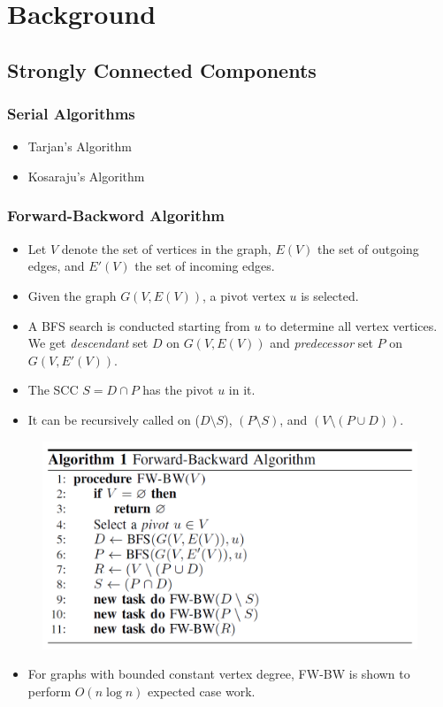 \section{Background}

\subsection{Strongly Connected Components}
\begin{frame}
	\frametitle{Serial Algorithms}
	\begin{itemize}
		\setlength\itemsep{1em}
		\item Tarjan's Algorithm
		\item Kosaraju's Algorithm
	\end{itemize}
\end{frame}

\begin{frame}
	\frametitle{Forward-Backword Algorithm}
	\begin{itemize}
		\setlength\itemsep{1em}
		\item Let $V$ denote the set of vertices in the graph,
			$E(V)$ the set of outgoing edges, and $E'(V)$ the set
			of incoming edges.
		\item Given the graph $G(V, E(V))$, a pivot vertex $u$ is selected.
		\item A BFS search is conducted starting from $u$ to determine all 
			vertex vertices. We get \textit{descendant} set $D$ on $G(V, E(V))$ 
			and \textit{predecessor} set $P$ on $G(V, E'(V))$.
		\item The SCC $S = D \cap P$ has the pivot $u$ in it.
		\item It can be recursively called on ($D \setminus S$), 
			$(P \setminus S)$, and $(V \setminus (P \cup D))$.
	\end{itemize}
\end{frame}

\begin{frame}
	\begin{figure}
		\includegraphics[scale=0.30]{figure/fig-FW-BW.png}
	\end{figure}
	\begin{itemize}
		\item For graphs with bounded constant vertex degree, 
			FW-BW is shown to perform $O(n \log n)$ expected case work.
	\end{itemize}
\end{frame}

